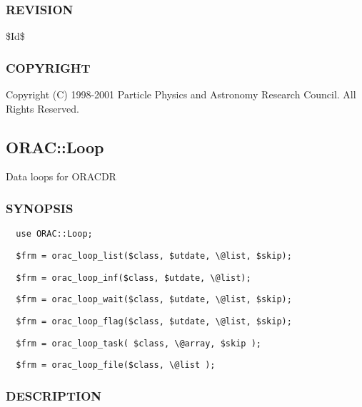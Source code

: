\subsubsection*{REVISION\label{ORAC::LogFile_REVISION}}


\$Id\$

\subsubsection*{COPYRIGHT\label{ORAC::LogFile_COPYRIGHT}}


Copyright (C) 1998-2001 Particle Physics and Astronomy Research
Council. All Rights Reserved.

\subsection{ORAC::Loop\label{ORAC::Loop}}


Data loops for ORACDR

\subsubsection*{SYNOPSIS\label{ORAC::Loop_SYNOPSIS}}
\begin{verbatim}
  use ORAC::Loop;
\end{verbatim}
\begin{verbatim}
  $frm = orac_loop_list($class, $utdate, \@list, $skip);
\end{verbatim}
\begin{verbatim}
  $frm = orac_loop_inf($class, $utdate, \@list);
\end{verbatim}
\begin{verbatim}
  $frm = orac_loop_wait($class, $utdate, \@list, $skip);
\end{verbatim}
\begin{verbatim}
  $frm = orac_loop_flag($class, $utdate, \@list, $skip);
\end{verbatim}
\begin{verbatim}
  $frm = orac_loop_task( $class, \@array, $skip );
\end{verbatim}
\begin{verbatim}
  $frm = orac_loop_file($class, \@list );
\end{verbatim}
\subsubsection*{DESCRIPTION\label{ORAC::Loop_DESCRIPTION}}


